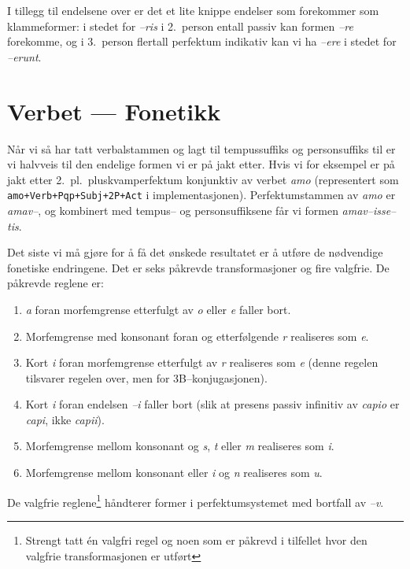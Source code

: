 \documentclass[a4paper]{article}
\begin{document}
I tillegg til endelsene over er det et lite knippe endelser som forekommer som
klammeformer: i stedet for \emph{--ris} i 2.~person entall passiv kan formen
\emph{--re} forekomme, og i 3.~person flertall perfektum indikativ kan vi ha
\emph{--ere} i stedet for \emph{--erunt}.

\section{Verbet --- Fonetikk}
N\aa{}r vi s\aa{} har tatt verbalstammen og lagt til tempussuffiks og
personsuffiks til er vi halvveis til den endelige formen vi er p\aa{} jakt
etter. Hvis vi for eksempel er p\aa{} jakt etter 2.~pl.~pluskvamperfektum
konjunktiv av verbet \emph{amo} (representert som
\texttt{amo+Verb+Pqp+Subj+2P+Act} i implementasjonen). Perfektumstammen av
\emph{amo} er \emph{amav--}, og kombinert med tempus-- og personsuffiksene
f\aa{}r vi formen \emph{amav--isse--tis}.

Det siste vi m\aa{} gj\o{}re for \aa{} f\aa{} det \o{}nskede resultatet er
\aa{} utf\o{}re de n\o{}dvendige fonetiske endringene. Det er seks
p\aa{}krevde transformasjoner og fire valgfrie. De p\aa{}krevde reglene er:
\begin{enumerate}
\item \emph{a} foran morfemgrense etterfulgt av \emph{o} eller \emph{e} faller
bort.

\item Morfemgrense med konsonant foran og etterf\o{}lgende \emph{r} realiseres
som \emph{e}.

\item Kort \emph{i} foran morfemgrense etterfulgt av \emph{r} realiseres som
\emph{e} (denne regelen tilsvarer regelen over, men for 3B--konjugasjonen).

\item Kort \emph{i} foran endelsen \emph{--i} faller bort (slik at presens
passiv infinitiv av \emph{capio} er \emph{capi}, ikke \emph{capii}).

\item Morfemgrense mellom konsonant og \emph{s}, \emph{t} eller \emph{m}
realiseres som \emph{i}.

\item Morfemgrense mellom konsonant eller \emph{i} og \emph{n} realiseres som
\emph{u}.
\end{enumerate}

De valgfrie reglene\footnote{Strengt tatt \'en valgfri regel og noen som er
p\aa{}krevd i tilfellet hvor den valgfrie transformasjonen er utf\o{}rt}
h\aa{}ndterer former i perfektumsystemet med bortfall av \emph{--v}.
\end{document}
